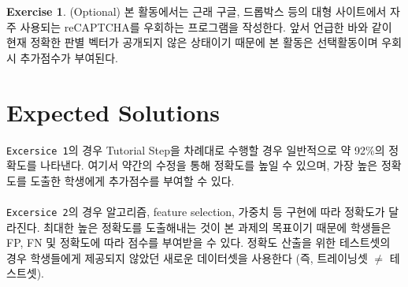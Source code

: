 \documentclass[a4paper, 11pt]{article}
\theoremstyle{definition}
\newtheorem{exercise}{Exercise}
\begin{document}
\begin{exercise} (Optional)
본 활동에서는 근래 구글, 드롭박스 등의 대형 사이트에서 자주 사용되는 reCAPTCHA를 우회하는 프로그램을 작성한다. 
앞서 언급한 바와 같이 현재 정확한 판별 벡터가 공개되지 않은 상태이기 때문에 본 활동은 선택활동이며 우회시 추가점수가 부여된다.
\end{exercise}

\section{Expected Solutions}
\texttt{Excersice 1}의 경우 Tutorial Step을 차례대로 수행할 경우 일반적으로 약 92\%의 정확도를 나타낸다. 
여기서 약간의 수정을 통해 정확도를 높일 수 있으며, 가장 높은 정확도를 도출한 학생에게 추가점수를 부여할 수 있다. \\\\
\texttt{Excersice 2}의 경우 알고리즘, feature selection, 가중치 등 구현에 따라 정확도가 달라진다. 
최대한 높은 정확도를 도출해내는 것이 본 과제의 목표이기 때문에 학생들은 FP, FN 및 정확도에 따라 점수를 부여받을 수 있다.
정확도 산출을 위한 테스트셋의 경우 학생들에게 제공되지 않았던 새로운 데이터셋을 사용한다 (즉, 트레이닝셋 $\neq$ 테스트셋).



\end{document}
